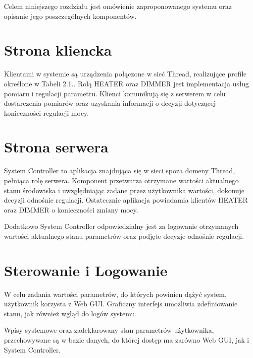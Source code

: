Celem niniejszego rozdziału jest omówienie zaproponowanego systemu oraz opisanie jego poszczególnych komponentów. 

\section{Strona kliencka}

Klientami w systemie są urządzenia połączone w sieć Thread, realizujące profile określone w Tabeli 2.1.. Rolą HEATER oraz DIMMER jest implementacja usług pomiaru i regulacji parametru.
Klienci komunikują się z serwerem w celu dostarczenia pomiarów oraz uzyskania informacji o decyzji dotyczącej konieczności regulacji mocy.
    
\section{Strona serwera}

System Controller to aplikacja znajdująca się w sieci spoza domeny Thread, pełniąca rolę serwera. Komponent przetwarza otrzymane wartości aktualnego stanu środowiska i uwzględniając zadane przez użytkownika wartości, dokonuje decyzji odnośnie regulacji. Ostatecznie aplikacja powiadamia klientów HEATER oraz DIMMER o konieczności zmiany mocy.

Dodatkowo System Controller odpowiedzialny jest za logowanie otrzymanych wartości aktualnego stanu parametrów oraz podjęte decyzje odnośnie regulacji.

\section{Sterowanie i Logowanie}

W celu zadania wartości parametrów, do których powinien dążyć system, użytkownik korzysta z Web GUI. Graficzny interfejs umożliwia zdefiniowanie stanu, jak również wgląd do logów systemu.

Wpisy systemowe oraz zadeklarowany stan parametrów użytkownika, przechowywane są w bazie danych, do której dostęp ma zarówno Web GUI, jak i System Controller.